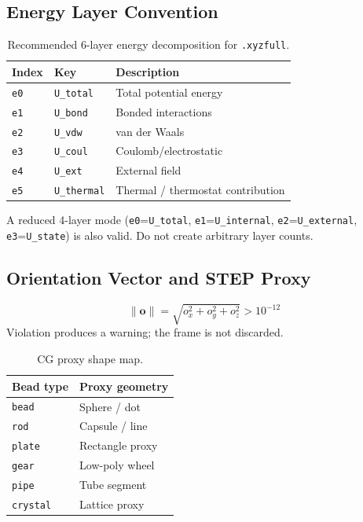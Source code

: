 \documentclass[12pt, a4paper, oneside]{article}
\begin{document}
\subsection{Energy Layer Convention}

\begin{table}[htbp]
  \centering
  \caption{Recommended 6-layer energy decomposition for \texttt{.xyzfull}.}
  \label{tab:xyzfull_energy}
  \begin{tabular}{lll}
    \toprule
    Index & Key & Description \\
    \midrule
    \texttt{e0} & \texttt{U\_total}   & Total potential energy \\
    \texttt{e1} & \texttt{U\_bond}    & Bonded interactions \\
    \texttt{e2} & \texttt{U\_vdw}     & van der Waals \\
    \texttt{e3} & \texttt{U\_coul}    & Coulomb/electrostatic \\
    \texttt{e4} & \texttt{U\_ext}     & External field \\
    \texttt{e5} & \texttt{U\_thermal} & Thermal / thermostat contribution \\
    \bottomrule
  \end{tabular}
\end{table}

A reduced 4-layer mode (\texttt{e0}=\texttt{U\_total}, \texttt{e1}=\texttt{U\_internal},
\texttt{e2}=\texttt{U\_external}, \texttt{e3}=\texttt{U\_state}) is also valid.
Do not create arbitrary layer counts.

\subsection{Orientation Vector and STEP Proxy}

\begin{equation}
  \|\mathbf{o}\| = \sqrt{o_x^2 + o_y^2 + o_z^2} > 10^{-12} \label{eq:orient}
\end{equation}
Violation produces a warning; the frame is not discarded.

\begin{table}[htbp]
  \centering
  \caption{CG proxy shape map.}
  \label{tab:xyzfull_proxy}
  \begin{tabular}{ll}
    \toprule
    Bead type & Proxy geometry \\
    \midrule
    \texttt{bead}    & Sphere / dot \\
    \texttt{rod}     & Capsule / line \\
    \texttt{plate}   & Rectangle proxy \\
    \texttt{gear}    & Low-poly wheel \\
    \texttt{pipe}    & Tube segment \\
    \texttt{crystal} & Lattice proxy \\
    \bottomrule
  \end{tabular}
\end{table}
\end{document}
